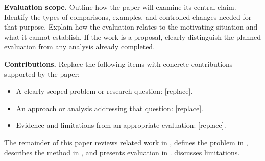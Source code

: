 \textbf{Evaluation scope.}
Outline how the paper will examine its central claim. Identify the types
of comparisons, examples, and controlled changes needed for that purpose.
Explain how the evaluation relates to the motivating situation and what
it cannot establish. If the work is a proposal, clearly distinguish the
planned evaluation from any analysis already completed.

\textbf{Contributions.}
Replace the following items with concrete contributions supported by the paper:
\begin{itemize}
  \item A clearly scoped problem or research question: [replace].
  \item An approach or analysis addressing that question: [replace].
  \item Evidence and limitations from an appropriate evaluation: [replace].
\end{itemize}

The remainder of this paper reviews related work in ,
defines the problem in , describes the method in
, and presents evaluation in .
 discusses limitations.
